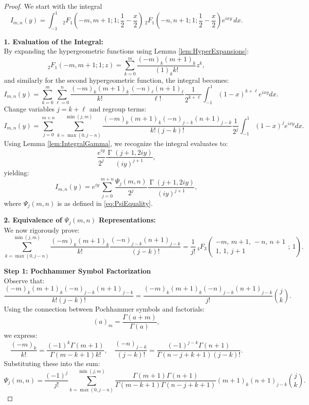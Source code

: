 \documentclass[12pt]{article}
\DeclareMathOperator{\gamma}{\Gamma}
\begin{document}
\begin{proof}
We start with the integral
\[
I_{m,n}(y) = \int_{-1}^1 {}_2F_1\left(-m, m+1; 1; \frac{1}{2}-\frac{x}{2}\right)
\, {}_2F_1\left(-n, n+1; 1; \frac{1}{2}-\frac{x}{2}\right) e^{i x y}\, dx.
\]

\textbf{1. Evaluation of the Integral:}\\[1mm]
By expanding the hypergeometric functions using Lemma \ref{lem:HyperExpansions}:
\[
{}_2F_1(-m, m+1; 1; z) = \sum_{k=0}^m \frac{(-m)_k (m+1)_k}{(1)_k k!} z^k,
\]
and similarly for the second hypergeometric function, the integral becomes:
\[
I_{m,n}(y) = \sum_{k=0}^m \sum_{\ell=0}^n \frac{(-m)_k (m+1)_k}{k!} \frac{(-n)_\ell (n+1)_\ell}{\ell!} \frac{1}{2^{k+\ell}} \int_{-1}^1 (1-x)^{k+\ell} e^{i x y} dx.
\]
Change variables $j = k + \ell$ and regroup terms:
\[
I_{m,n}(y) = \sum_{j=0}^{m+n} \sum_{k=\max(0,j-n)}^{\min(j,m)} \frac{(-m)_k (m+1)_k (-n)_{j-k} (n+1)_{j-k}}{k! (j-k)!} \frac{1}{2^j} \int_{-1}^1 (1-x)^j e^{i x y} dx.
\]
Using Lemma \ref{lem:IntegralGamma}, we recognize the integral evaluates to:
\[
\frac{e^{iy}}{2^j} \frac{\gamma(j+1, 2iy)}{(iy)^{j+1}},
\]
yielding:
\[
I_{m,n}(y) = e^{iy} \sum_{j=0}^{m+n} \frac{\Psi_j(m,n)}{2^j} \frac{\gamma(j+1,2iy)}{(iy)^{j+1}},
\]
where $\Psi_j(m,n)$ is as defined in \eqref{eq:PsiEquality}.

\textbf{2. Equivalence of $\Psi_j(m,n)$ Representations:}\\[1mm]
We now rigorously prove:
\[
\sum_{k=\max(0,j-n)}^{\min(j,m)} \frac{(-m)_k (m+1)_k}{k!} \frac{(-n)_{j-k} (n+1)_{j-k}}{(j-k)!} = \frac{1}{j!} {\,}_4F_3\left(
\begin{matrix}
-m,\, m+1,\, -n,\, n+1 \\
1,\, 1,\, j+1
\end{matrix};\, 1\right).
\]

\textbf{Step 1: Pochhammer Symbol Factorization}\\[1mm]
Observe that:
\[
\frac{(-m)_k (m+1)_k (-n)_{j-k} (n+1)_{j-k}}{k! (j-k)!} = \frac{(-m)_k (m+1)_k (-n)_{j-k} (n+1)_{j-k}}{j!} \binom{j}{k}.
\]
Using the connection between Pochhammer symbols and factorials:
\[
(a)_m = \frac{\Gamma(a + m)}{\Gamma(a)},
\]
we express:
\[
\frac{(-m)_k}{k!} = \frac{(-1)^k \Gamma(m + 1)}{\Gamma(m - k + 1) k!}, \quad
\frac{(-n)_{j-k}}{(j - k)!} = \frac{(-1)^{j - k} \Gamma(n + 1)}{\Gamma(n - j + k + 1) (j - k)!}.
\]
Substituting these into the sum:
\[
\Psi_j(m,n) = \frac{(-1)^{j}}{j!} \sum_{k=\max(0,j-n)}^{\min(j,m)} \frac{\Gamma(m + 1)\Gamma(n + 1)}{\Gamma(m - k + 1)\Gamma(n - j + k + 1)} (m+1)_k (n+1)_{j - k} \binom{j}{k}.
\]


\end{proof}
\end{document}
